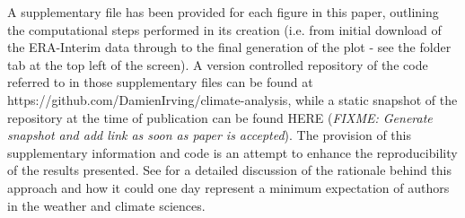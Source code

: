 A supplementary file has been provided for each figure in this paper, outlining the computational steps performed in its creation (i.e. from initial download of the ERA-Interim data through to the final generation of the plot - see the folder tab at the top left of the screen). A version controlled repository of the code referred to in those supplementary files can be found at https://github.com/DamienIrving/climate-analysis, while a static snapshot of the repository at the time of publication can be found HERE (\textit{FIXME: Generate snapshot and add link as soon as paper is accepted}). The provision of this supplementary information and code is an attempt to enhance the reproducibility of the results presented. See \citet{Irving2015} for a detailed discussion of the rationale behind this approach and how it could one day represent a minimum expectation of authors in the weather and climate sciences. 